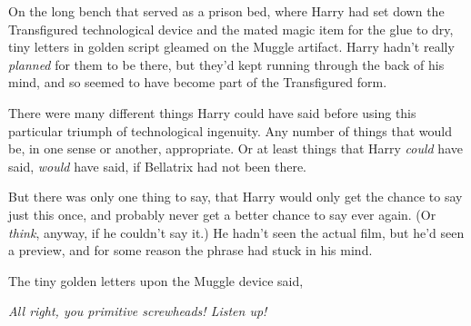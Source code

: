 On the long bench that served as a prison bed, where Harry had set down the Transfigured technological device and the mated magic item for the glue to dry, tiny letters in golden script gleamed on the Muggle artifact. Harry hadn't really \emph{planned} for them to be there, but they'd kept running through the back of his mind, and so seemed to have become part of the Transfigured form.

There were many different things Harry could have said before using this particular triumph of technological ingenuity. Any number of things that would be, in one sense or another, appropriate. Or at least things that Harry \emph{could} have said, \emph{would} have said, if Bellatrix had not been there.

But there was only one thing to say, that Harry would only get the chance to say just this once, and probably never get a better chance to say ever again. (Or \emph{think}, anyway, if he couldn't say it.) He hadn't seen the actual film, but he'd seen a preview, and for some reason the phrase had stuck in his mind.

The tiny golden letters upon the Muggle device said,

\emph{All right, you primitive screwheads! Listen up!}


